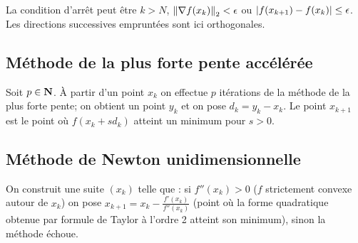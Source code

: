 	La condition d'arrêt peut être $k > N$, $\left\lVert\nabla f(x_k)\right\rVert_2 < \epsilon$ ou $\left\lvert f(x_{k + 1}) - f(x_k)\right\rvert \leq \epsilon$.
	Les directions successives empruntées sont ici orthogonales.


\subsection{Méthode de la plus forte pente accélérée}

	Soit $p \in \mathbf{N}$.
	À partir d'un point $x_k$ on effectue $p$ itérations de la méthode de la plus forte pente; on obtient un point $y_k$ et on pose $d_k = y_k - x_k$.
	Le point $x_{k + 1}$ est le point où $f(x_k + s d_k)$ atteint un minimum pour $s > 0$.







\subsection{Méthode de Newton unidimensionnelle}

	On construit une suite $(x_k)$ telle que : si $f''(x_k) > 0$ ($f$ strictement convexe autour de $x_k$) on pose $x_{k + 1} = x_k - \frac{f'(x_k)}{f''(x_k)}$ (point où la forme quadratique obtenue par formule de Taylor à l'ordre 2 atteint son minimum), sinon la méthode échoue.


